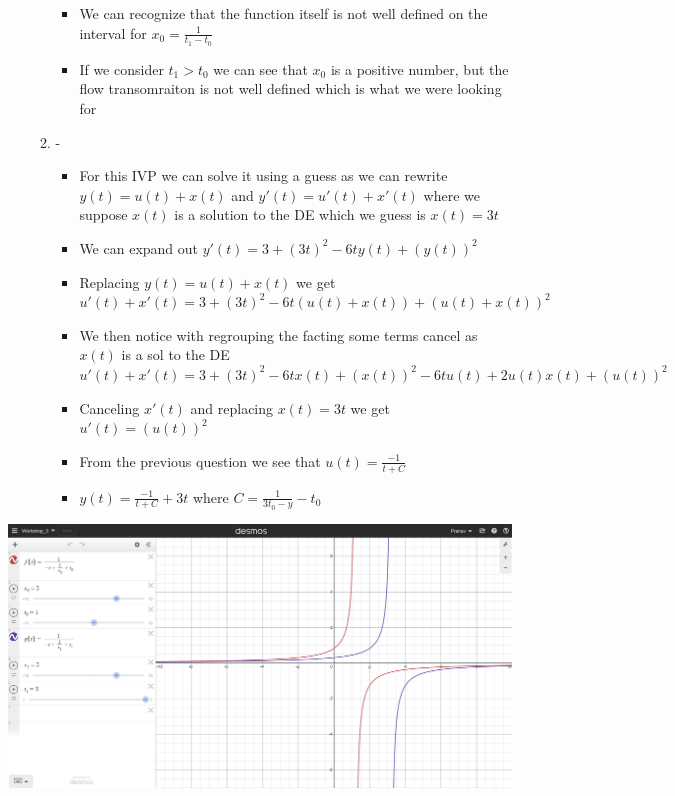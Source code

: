 \documentclass{article}
\begin{document}
\begin{enumerate}
\begin{enumerate}
\begin{itemize}
            \item We can recognize that the function itself is not well defined on the interval for $x_0 = \frac{1}{t_1 - t_0} $ 
            \item If we consider $t_1 > t_0$ we can see that $x_0 $ is a positive number, but the flow transomraiton is not well defined which is what we were looking for
        \end{itemize}
        \item - \begin{itemize}
            \item For this IVP we can solve it using a guess as we can rewrite $y(t) = u(t) + x(t)$ and $y'(t) = u'(t) + x'(t) $ where we suppose $x(t) $ is a solution to the DE which we guess is $x(t) = 3t $
            \item We can expand out $y'(t) = 3 + (3t)^2 - 6ty(t) + (y(t))^2$ 
            \item Replacing $y(t) = u(t) + x(t)$ we get $u'(t) + x'(t) = 3 + (3t)^2 - 6t(u(t) + x(t)) + (u(t) + x(t))^2 $
            \item We then notice with regrouping the facting some terms cancel as $x(t)$ is a sol to the DE $u'(t) + x'(t) = 3 + (3t)^2 - 6tx(t) +(x(t))^2 - 6tu(t) + 2u(t)x(t) + (u(t))^2$
            \item Canceling $x'(t) $ and replacing $x(t) =3t $ we get $u'(t) = (u(t))^2 $
            \item From the previous question we see that $u(t) = \frac{-1}{t+C}$
            \item $y(t) = \frac{-1}{t+C} + 3t $ where $C = \frac{1}{3t_0 -y} - t_0 $
        \end{itemize}
    \end{enumerate}
    
\end{enumerate}

\includegraphics[scale=.2]{IVP_3.png}
\end{document}
